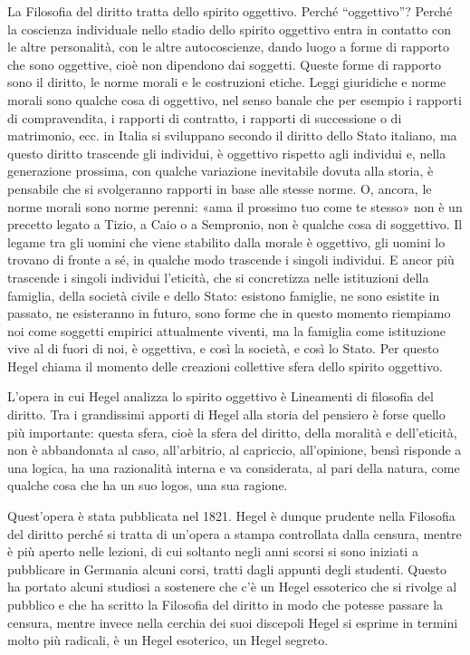 \documentclass[a4paper,12pt,oneside,openany]{book}%
\begin{document}
La Filosofia del diritto tratta dello spirito oggettivo. Perché “oggettivo”? Perché la coscienza individuale nello stadio dello spirito oggettivo entra in contatto con le altre personalità, con le altre autocoscienze, dando luogo a forme di rapporto che sono oggettive, cioè non dipendono dai soggetti. Queste forme di rapporto sono il diritto, le norme morali e le costruzioni etiche. Leggi giuridiche e norme morali sono qualche cosa di oggettivo, nel senso banale che per esempio i rapporti di compravendita, i rapporti di contratto, i rapporti di successione o di matrimonio, ecc. in Italia si sviluppano secondo il diritto dello Stato italiano, ma questo diritto trascende gli individui, è oggettivo rispetto agli individui e, nella generazione prossima, con qualche variazione inevitabile dovuta alla storia, è pensabile che si svolgeranno rapporti in base alle stesse norme. O, ancora, le norme morali sono norme perenni: «ama il prossimo tuo come te stesso» non è un precetto legato a Tizio, a Caio o a Sempronio, non è qualche cosa di soggettivo. Il legame tra gli uomini che viene stabilito dalla morale è oggettivo, gli uomini lo trovano di fronte a sé, in qualche modo trascende i singoli individui. E ancor più trascende i singoli individui l’eticità, che si concretizza nelle istituzioni della famiglia, della società civile e dello Stato: esistono famiglie, ne sono esistite in passato, ne esisteranno in futuro, sono forme che in questo momento riempiamo noi come soggetti empirici attualmente viventi, ma la famiglia come istituzione vive al di fuori di noi, è oggettiva, e così la società, e così lo Stato. Per questo Hegel chiama il momento delle creazioni collettive sfera dello spirito oggettivo.

L’opera in cui Hegel analizza lo spirito oggettivo è Lineamenti di filosofia del diritto. Tra i grandissimi apporti di Hegel alla storia del pensiero è forse quello più importante: questa sfera, cioè la sfera del diritto, della moralità e dell’eticità, non è abbandonata al caso, all’arbitrio, al capriccio, all’opinione, bensì risponde a una logica, ha una razionalità interna e va considerata, al pari della natura, come qualche cosa che ha un suo logos, una sua ragione.

Quest’opera è stata pubblicata nel 1821. Hegel è dunque prudente nella Filosofia del diritto perché si tratta di un’opera a stampa controllata dalla censura, mentre è più aperto nelle lezioni, di cui soltanto negli anni scorsi si sono iniziati a pubblicare in Germania alcuni corsi, tratti dagli appunti degli studenti. Questo ha portato alcuni studiosi a sostenere che c’è un Hegel essoterico che si rivolge al pubblico e che ha scritto la Filosofia del diritto in modo che potesse passare la censura, mentre invece nella cerchia dei suoi discepoli Hegel si esprime in termini molto più radicali, è un Hegel esoterico, un Hegel segreto.
	
\end{document}
